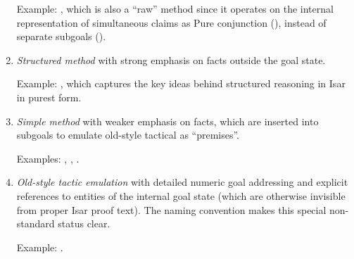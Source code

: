 \begin{isabellebody}
\begin{isamarkuptext}
\begin{enumerate}
  Example: \hyperlink{method.induct}{\mbox{}}, which is also a ``raw'' method since it
  operates on the internal representation of simultaneous claims as
  Pure conjunction (), instead of separate
  subgoals ().

  \item \emph{Structured method} with strong emphasis on facts outside
  the goal state.

  Example: \hyperlink{method.rule}{\mbox{}}, which captures the key ideas behind
  structured reasoning in Isar in purest form.

  \item \emph{Simple method} with weaker emphasis on facts, which are
  inserted into subgoals to emulate old-style tactical as
  ``premises''.

  Examples: \hyperlink{method.simp}{\mbox{}}, \hyperlink{method.blast}{\mbox{}}, \hyperlink{method.auto}{\mbox{}}.

  \item \emph{Old-style tactic emulation} with detailed numeric goal
  addressing and explicit references to entities of the internal goal
  state (which are otherwise invisible from proper Isar proof text).
  The naming convention  makes this special
  non-standard status clear.

  Example: \hyperlink{method.rule-tac}{\mbox{}}.

  \end{enumerate}


\end{isamarkuptext}
\end{isabellebody}

